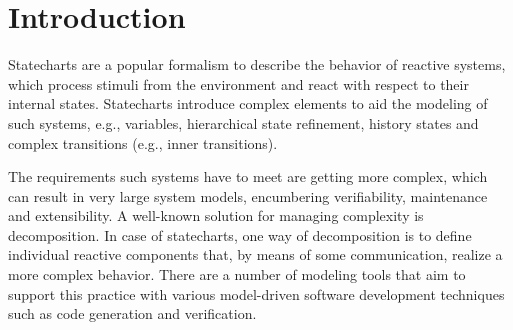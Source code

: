 \begin{abstract}
\end{abstract}

%
\IEEEpeerreviewmaketitle

\section{Introduction}
\label{sec:introduction}
Statecharts \cite{Harel:1987:SVF:34884.34886} are a popular formalism to describe the behavior of reactive systems, which process stimuli from the environment and react with respect to their internal states. Statecharts introduce complex elements to aid the modeling of such systems, e.g., variables, hierarchical state refinement, history states and complex transitions (e.g., inner transitions).

The requirements such systems have to meet are getting more complex, which can result in very large system models, encumbering verifiability, maintenance and extensibility. A well-known solution for managing complexity is decomposition. In case of statecharts, one way of decomposition is to define individual reactive components that, by means of some communication, realize a more complex behavior. There are a number of modeling tools that aim to support this practice with various model-driven software development techniques such as code generation and verification.

